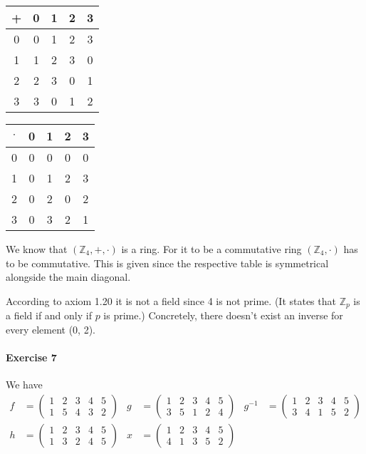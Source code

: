\documentclass{article}
\begin{document}
\begin{center}
    \begin{tabular}{c | c c c c}
        + & 0 & 1 & 2 & 3 \\\midrule
        0 & 0 & 1 & 2 & 3 \\
        1 & 1 & 2 & 3 & 0 \\
        2 & 2 & 3 & 0 & 1 \\
        3 & 3 & 0 & 1 & 2 \\
    \end{tabular}
    \qquad
    \begin{tabular}{c | c c c c}
        $\cdot$ & 0 & 1 & 2 & 3 \\\midrule
        0 & 0 & 0 & 0 & 0 \\
        1 & 0 & 1 & 2 & 3 \\
        2 & 0 & 2 & 0 & 2 \\
        3 & 0 & 3 & 2 & 1 \\
    \end{tabular}
\end{center}

We know that $(\mathbb{Z}_4, +, \cdot)$ is a ring. For it to be a commutative ring $(\mathbb{Z}_4, \cdot)$ has to be commutative. This is given since the respective table is symmetrical alongside the main diagonal.

According to axiom 1.20 it is not a field since 4 is not prime. (It states that $\mathbb{Z}_p$ is a field if and only if $p$ is prime.) Concretely, there doesn't exist an inverse for every element (0, 2).

\pagebreak
\paragraph{Exercise 7}

We have
\begin{align*}
    f &= \begin{pmatrix}
        1 & 2 & 3 & 4 & 5 \\
        1 & 5 & 4 & 3 & 2
    \end{pmatrix}&
    g &= \begin{pmatrix}
        1 & 2 & 3 & 4 & 5 \\
        3 & 5 & 1 & 2 & 4
    \end{pmatrix}&
    g^{-1} &= \begin{pmatrix}
        1 & 2 & 3 & 4 & 5 \\
        3 & 4 & 1 & 5 & 2
    \end{pmatrix}& \\
    h &= \begin{pmatrix}
        1 & 2 & 3 & 4 & 5 \\
        1 & 3 & 2 & 4 & 5
    \end{pmatrix}&
    x &= \begin{pmatrix}
        1 & 2 & 3 & 4 & 5 \\
        4 & 1 & 3 & 5 & 2
    \end{pmatrix}
\end{align*}
\end{document}
